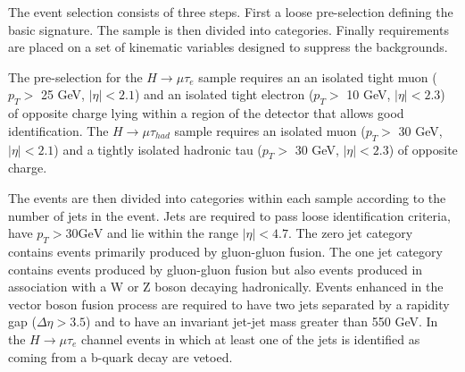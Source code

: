 \documentclass[oneside, letterpaper, oldfontcommands]{memoir}
\begin{document}
{{{The event selection consists of three steps. First  a loose pre-selection defining the basic signature. The sample is then divided into categories.
Finally requirements are placed on  a set of kinematic variables designed to suppress the backgrounds.


The pre-selection for the  $H \rightarrow \mu \tau_{e}$  sample requires an an isolated tight muon
($p_{T} >$ 25 GeV, $|\eta| <2.1$) and an  isolated tight electron ($p_{T} >$ 10 GeV, $|\eta| <2.3$)  of opposite charge lying within a region of the detector that allows good identification. The
$H \rightarrow \mu \tau_{had}$ sample requires an isolated muon ($p_{T} >$ 30 GeV, $|\eta| <2.1$) and a tightly isolated  hadronic tau ($p_{T} >$ 30 GeV, $|\eta| <2.3$) of opposite charge.

The events are then divided into categories within each sample according to the number of jets in the
event. Jets are required to pass loose identification criteria, have $p_{T}> 30 \mathrm{GeV}$ and
lie within the range $|\eta| < 4.7$. The zero jet category contains events primarily produced by gluon-gluon fusion.
The one jet category contains events produced by gluon-gluon fusion but also events produced in association with
a W or Z boson decaying hadronically. Events enhanced in  the vector boson fusion
process are required to have two jets separated by a rapidity gap ($\Delta \eta > 3.5$)  and to have an invariant
jet-jet mass greater than 550 GeV. In the $H \rightarrow \mu \tau_{e}$ channel events in which at least one of the jets is identified
as coming from a b-quark decay are vetoed.

}}}
\end{document}
